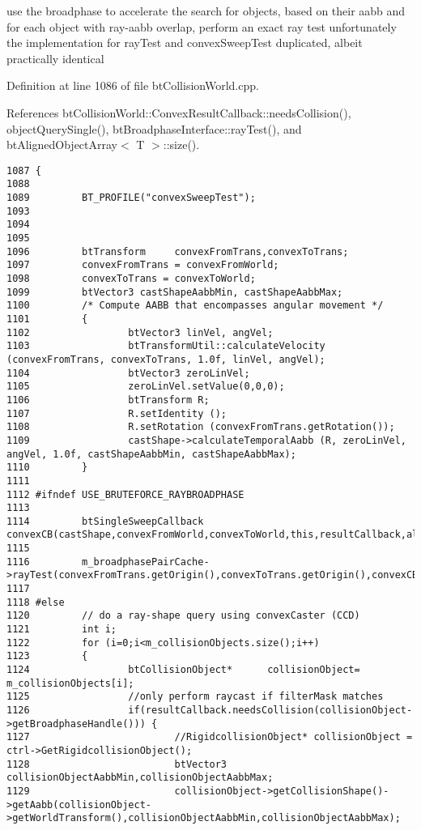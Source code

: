 use the broadphase to accelerate the search for objects, based on their aabb and for each object with ray-aabb overlap, perform an exact ray test unfortunately the implementation for rayTest and convexSweepTest duplicated, albeit practically identical 

Definition at line 1086 of file btCollisionWorld.cpp.

References btCollisionWorld::ConvexResultCallback::needsCollision(), objectQuerySingle(), btBroadphaseInterface::rayTest(), and btAlignedObjectArray$<$ T $>$::size().

\begin{Code}\begin{verbatim}1087 {
1088 
1089         BT_PROFILE("convexSweepTest");
1093 
1094 
1095 
1096         btTransform     convexFromTrans,convexToTrans;
1097         convexFromTrans = convexFromWorld;
1098         convexToTrans = convexToWorld;
1099         btVector3 castShapeAabbMin, castShapeAabbMax;
1100         /* Compute AABB that encompasses angular movement */
1101         {
1102                 btVector3 linVel, angVel;
1103                 btTransformUtil::calculateVelocity (convexFromTrans, convexToTrans, 1.0f, linVel, angVel);
1104                 btVector3 zeroLinVel;
1105                 zeroLinVel.setValue(0,0,0);
1106                 btTransform R;
1107                 R.setIdentity ();
1108                 R.setRotation (convexFromTrans.getRotation());
1109                 castShape->calculateTemporalAabb (R, zeroLinVel, angVel, 1.0f, castShapeAabbMin, castShapeAabbMax);
1110         }
1111 
1112 #ifndef USE_BRUTEFORCE_RAYBROADPHASE
1113 
1114         btSingleSweepCallback   convexCB(castShape,convexFromWorld,convexToWorld,this,resultCallback,allowedCcdPenetration);
1115 
1116         m_broadphasePairCache->rayTest(convexFromTrans.getOrigin(),convexToTrans.getOrigin(),convexCB,castShapeAabbMin,castShapeAabbMax);
1117 
1118 #else
1120         // do a ray-shape query using convexCaster (CCD)
1121         int i;
1122         for (i=0;i<m_collisionObjects.size();i++)
1123         {
1124                 btCollisionObject*      collisionObject= m_collisionObjects[i];
1125                 //only perform raycast if filterMask matches
1126                 if(resultCallback.needsCollision(collisionObject->getBroadphaseHandle())) {
1127                         //RigidcollisionObject* collisionObject = ctrl->GetRigidcollisionObject();
1128                         btVector3 collisionObjectAabbMin,collisionObjectAabbMax;
1129                         collisionObject->getCollisionShape()->getAabb(collisionObject->getWorldTransform(),collisionObjectAabbMin,collisionObjectAabbMax);

\end{verbatim}
\end{Code}
